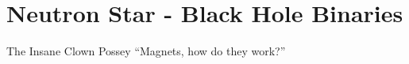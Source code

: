 \part[Neutron Star - Black Hole Binaries]{Neutron Star - Black Hole Binaries} \label{partII}



\vspace{-16pt} \begin{chapquote}{The Insane Clown Possey} \singlespacing ``Magnets, how do they work?'' 
 \end{chapquote} \vspace{-8pt}
\noindent\makebox[\linewidth]{\rule{0.5\textwidth}{0.5pt}} \vspace{1pt}





















